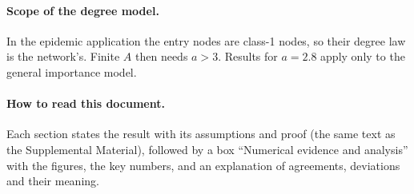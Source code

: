 \documentclass[11pt,a4paper]{article}
\theoremstyle{definition}
\theoremstyle{remark}
\begin{document}
\paragraph{Scope of the degree model.} In the epidemic application the entry
nodes are class-1 nodes, so their degree law is the network's. Finite $A$ then
needs $a>3$. Results for $a=2.8$ apply only to the general importance model.

\paragraph{How to read this document.} Each section states the result with its
assumptions and proof (the same text as the Supplemental Material), followed
by a box ``Numerical evidence and analysis'' with the figures, the key
numbers, and an explanation of agreements, deviations and their meaning.




\end{document}
